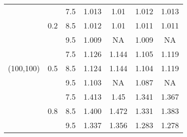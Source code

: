 \documentclass[a4,11pt,epsf, amssymb]{article}
\begin{document}
\begin{table}[htbp]
\begin{tabular}{c|cccccc}
    \hline
    \multirow{9}[6]{*}{(100,100)} & \multirow{3}[2]{*}{0.2} & 7.5   & 1.013  & 1.01 & 1.012 & 1.013 \\
          &       & 8.5   & 1.012  & 1.01 & 1.011 & 1.011 \\
          &       & 9.5   & 1.009  & NA    & 1.009 & NA\\
\cline{2-7}          & \multirow{3}[2]{*}{0.5} & 7.5   & 1.126  & 1.144 & 1.105 & 1.119 \\
          &       & 8.5   & 1.124  & 1.144 & 1.104 & 1.119 \\
          &       & 9.5   & 1.103  & NA    & 1.087 & NA \\
\cline{2-7}          & \multirow{3}[2]{*}{0.8} & 7.5   & 1.413  & 1.45  & 1.341 & 1.367 \\
          &       & 8.5   & 1.400  & 1.472 & 1.331 & 1.383 \\
          &       & 9.5   & 1.337  & 1.356 & 1.283 & 1.278 \\
    \hline
    \end{tabular}%
  \label{tab:addlabel}%
\end{table}%
\end{document}
